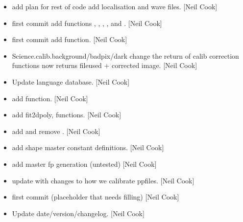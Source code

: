 \documentclass[a4paper,10pt,english]{report}
\begin{document}
\begin{itemize}
\item {} 
 \sphinxhyphen{} add plan for rest of code add
localisation and wave files. {[}Neil Cook{]}

\item {} 
 \sphinxhyphen{} first commit add  functions \sphinxhyphen{}
, , ,
,  and . {[}Neil Cook{]}

\item {} 
 \sphinxhyphen{} first commit add  function.
{[}Neil Cook{]}

\item {} 
Science.calib.background/badpix/dark \sphinxhyphen{} change the return of calib
correction functions \sphinxhyphen{} now returns fileused + corrected image. {[}Neil
Cook{]}

\item {} 
Update language database. {[}Neil Cook{]}

\item {} 
 \sphinxhyphen{} add  function. {[}Neil Cook{]}

\item {} 
 \sphinxhyphen{} add fit2dpoly,  functions. {[}Neil
Cook{]}

\item {} 
 \sphinxhyphen{} add  and remove .
{[}Neil Cook{]}

\item {} 
 \sphinxhyphen{} add shape master  constant
definitions. {[}Neil Cook{]}

\item {} 
 \sphinxhyphen{} add master fp generation (untested) {[}Neil
Cook{]}

\item {} 
 \sphinxhyphen{} update  with changes to how we calibrate
ppfiles. {[}Neil Cook{]}

\item {} 
 \sphinxhyphen{} first commit (placeholder that needs
filling) {[}Neil Cook{]}

\item {} 
Update date/version/changelog. {[}Neil Cook{]}

\end{itemize}
\end{document}
